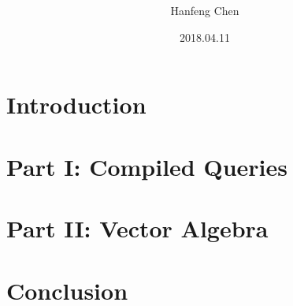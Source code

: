 \documentclass[11pt]{beamer}
\author{Hanfeng Chen}
\title{
  {\color{Black}{Improving Database Performance on Modern Hardware}}
}
\date{2018.04.11}
\begin{document}
\begin{frame}
\titlepage
\end{frame}




\section{Introduction}


%

\section{Part I: Compiled Queries}


\section{Part II: Vector Algebra}


\section{Conclusion}


% 
% 
\end{document}
